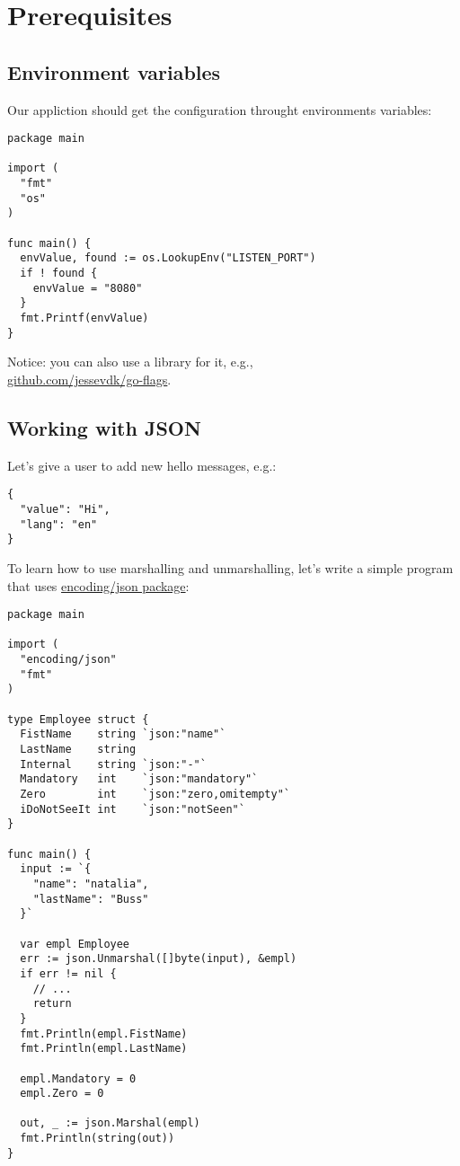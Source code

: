 \documentclass[11pt, letterpaper]{article}
\begin{document}
\section{Prerequisites}

\subsection{Environment variables}

Our appliction should get the configuration throught environments variables:

\begin{verbatim}
package main

import (
  "fmt"
  "os"
)

func main() {
  envValue, found := os.LookupEnv("LISTEN_PORT")
  if ! found {
    envValue = "8080"
  }
  fmt.Printf(envValue)
}
\end{verbatim}
\bigskip
Notice: you can also use a library for it, e.g.,\\ \href{https://github.com/jessevdk/go-flags}{github.com/jessevdk/go-flags}.

\subsection{Working with {\small JSON}}

Let's give a user to add new hello messages, e.g.:

\begin{verbatim}
{
  "value": "Hi",
  "lang": "en"
}
\end{verbatim}

To learn how to use marshalling and unmarshalling, let's write a simple program that uses \href{https://golang.org/pkg/encoding/json/}{encoding/json package}:

\begin{verbatim}
package main

import (
  "encoding/json"
  "fmt"
)

type Employee struct {
  FistName    string `json:"name"`
  LastName    string
  Internal    string `json:"-"`
  Mandatory   int    `json:"mandatory"`
  Zero        int    `json:"zero,omitempty"`
  iDoNotSeeIt int    `json:"notSeen"`
}

func main() {
  input := `{
    "name": "natalia",
    "lastName": "Buss"
  }`

  var empl Employee
  err := json.Unmarshal([]byte(input), &empl)
  if err != nil {
    // ...
    return
  }
  fmt.Println(empl.FistName)
  fmt.Println(empl.LastName)

  empl.Mandatory = 0
  empl.Zero = 0

  out, _ := json.Marshal(empl)
  fmt.Println(string(out))
}
\end{verbatim}
\end{document}
